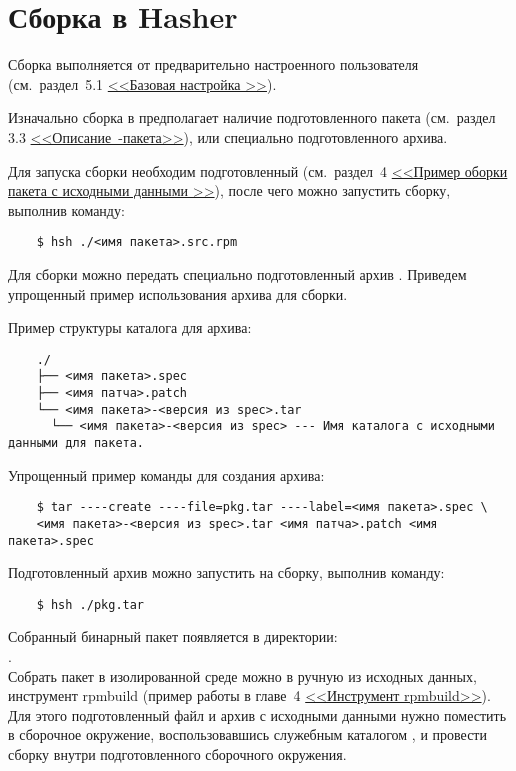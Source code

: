 \section{Сборка в Hasher}
Сборка выполняется от предварительно настроенного пользователя
(см.~раздел~5.1 \hyperlink{5.1}{<<Базовая настройка >>}).

Изначально сборка в  предполагает наличие подготовленного  пакета
(см.~раздел 3.3 \hyperlink{rpm-pack-desc}{\mbox{<<Описание -пакета>>}}),
или специально подготовленного  архива.

Для запуска сборки необходим подготовленный  (см.~раздел~4
\hyperlink{rpmbuild-exampl-src}{<<Пример оборки пакета с исходными данными >>}),
после чего можно запустить сборку, выполнив команду:

\begin{verbatim}
	$ hsh ./<имя пакета>.src.rpm
\end{verbatim}

Для сборки можно передать специально подготовленный архив . Приведем упрощенный пример
использования архива для сборки.

Пример структуры каталога для архива:
\begin{verbatim}
	./
	├── <имя пакета>.spec
	├── <имя патча>.patch
	└── <имя пакета>-<версия из spec>.tar
	  └── <имя пакета>-<версия из spec> --- Имя каталога с исходными данными для пакета.
\end{verbatim}

Упрощенный пример команды для создания  архива:
\begin{verbatim}
	$ tar ----create ----file=pkg.tar ----label=<имя пакета>.spec \
	<имя пакета>-<версия из spec>.tar <имя патча>.patch <имя пакета>.spec
\end{verbatim}

Подготовленный архив можно запустить на сборку, выполнив команду:
\begin{verbatim}
	$ hsh ./pkg.tar
\end{verbatim}

Собранный бинарный пакет появляется в директории:\\ .\\

Собрать пакет в изолированной среде можно в ручную из исходных данных, инструмент rpmbuild (пример работы
в главе~4  \hyperlink{rpmbuild}{<<Инструмент rpmbuild>>}). Для этого подготовленный файл \Sys{.spec} и архив
с исходными данными нужно поместить в сборочное окружение, воспользовавшись служебным каталогом
\Sys{$\sim$/hasher/chroot/.in}, и провести сборку \Sys{rpmbuild} внутри подготовленного сборочного окружения.

